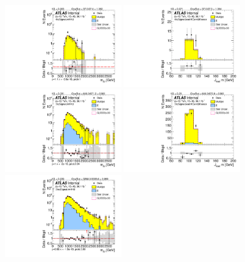 \begin{figure}[htbp!]
\begin{center}
\includegraphics[angle=270, width=0.45\textwidth]{./figures/boosted/ZZ/Moriond_ZZ_FourTag_Signal_mHH_l_1.pdf}
\includegraphics[angle=270, width=0.45\textwidth]{./figures/boosted/ZZ/Moriond_ZZ_FourTag_Signal_leadHCand_Mass_s.pdf}\\
\includegraphics[angle=270, width=0.45\textwidth]{./figures/boosted/ZZ/Moriond_ZZ_ThreeTag_Signal_mHH_l_1.pdf}
\includegraphics[angle=270, width=0.45\textwidth]{./figures/boosted/ZZ/Moriond_ZZ_ThreeTag_Signal_leadHCand_Mass_s.pdf}\\
\includegraphics[angle=270, width=0.45\textwidth]{./figures/boosted/ZZ/Moriond_ZZ_TwoTag_split_Signal_mHH_l_1.pdf}

\end{center}
\end{figure}
